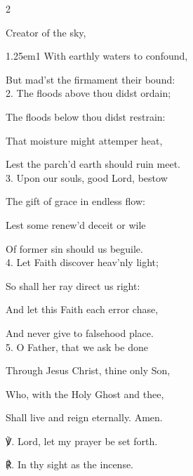 \begin{multicols}{2}
\sloppy

 Creator of the sky,


\begin{hangparas}{1.25em}{1}
With earthly waters to confound,

But mad'st the firmament their bound:\\

2. The floods above thou didst ordain;

The floods below thou didst restrain:

That moisture might attemper heat,

Lest the parch'd earth should ruin meet.\\

3. Upon our souls, good Lord, bestow

The gift of grace in endless flow:

Lest some renew'd deceit or wile

Of former sin should us beguile.\\

4. Let Faith discover heav'nly light;

So shall her ray direct us right:

And let this Faith each error chase,

And never give to falsehood place.\\

5. O Father, that we ask be done

Through Jesus Christ, thine only Son,

Who, with the Holy Ghost and thee,

Shall live and reign eternally. Amen.\\
\end{hangparas}

℣. Lord, let my prayer be set forth.

℟. In thy sight as the incense.


\fussy

\end{multicols}


